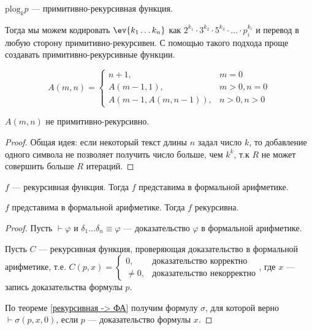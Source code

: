 \(\text{plog}_k p\) --- примитивно-рекурсивная функция.

Тогда мы можем кодировать \(\ev{k_1 \dots k_n}\) как \(2^{k_1} \cdot 3^{k_2} \cdot 5^{k_3} \cdot \ldots \cdot p_i^{k_i}\) и перевод в любую сторону примитивно-рекурсивен. С помощью такого подхода проще создавать примитивно-рекурсивные функции.

\begin{definition}
    \[A(m, n) = \begin{cases}
            n + 1,                 & m = 0        \\
            A(m - 1, 1),           & m > 0, n = 0 \\
            A(m - 1, A(m, n - 1)), & n > 0, n > 0
        \end{cases}\]
\end{definition}
\begin{statement}
    \(A(m, n)\) не примитивно-рекурсивно.
\end{statement}
\begin{proof}
    Общая идея: если некоторый текст длины \(n\) задал число \(k\), то добавление одного символа не позволяет получить число больше, чем \(k^k\), т.к \(R\) не может совершить больше \(R\) итераций.
\end{proof}

\begin{theorem}
    \(f\) --- рекурсивная функция. Тогда \(f\) представима в формальной арифметике.
    \label{рекурсивная -> ФА}
\end{theorem}
\begin{theorem}
    \(f\) представима в формальной арифметике. Тогда \(f\) рекурсивна.
\end{theorem}

\begin{proof}
    Пусть \(\vdash \varphi\) и \(\delta_1 \dots \delta_n \equiv \varphi\) --- доказательство \(\varphi\) в формальной арифметике.

    Пусть \(C\) --- рекурсивная функция, проверяющая доказательство в формальной арифметике, т.е. \(C(p, x) = \begin{cases} 0, & \text{доказательство корректно} \\ \neq 0, & \text{доказательство некорректно} \end{cases} \), где \(x\) --- запись доказательства формулы \(p\).

    По теореме \ref{рекурсивная -> ФА} получим формулу \(\sigma\), для которой верно \(\vdash \sigma(p, x, 0)\), если \(p\) --- доказательство формулы \(x\).
\end{proof}

